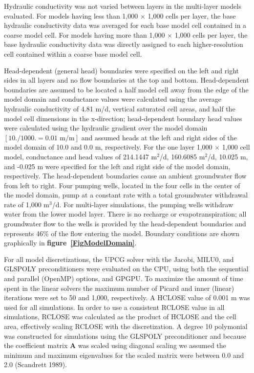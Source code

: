 \documentclass[12pt]{article}
\begin{document}
Hydraulic conductivity was not varied between layers in the multi-layer models evaluated. For models having less than 1,000 $\times$ 1,000 cells per layer, the base hydraulic conductivity data was averaged for each base model cell contained in a coarse model cell. For models having more than 1,000 $\times$ 1,000 cells per layer, the base hydraulic conductivity data was directly assigned to each higher-resolution cell contained within a coarse base model cell.

Head-dependent (general head) boundaries were specified on the left and right sides \color{cyan} in all layers \color{black} and no flow boundaries at the top and bottom. Head-dependent boundaries are assumed to be located a half model cell away from the edge of the model domain and conductance values were calculated using the average hydraulic conductivity of 4.81 m/d, vertical saturated cell areas, and half the model cell dimensions in the x-direction; head-dependent boundary head values were calculated using the hydraulic gradient over the model domain \color{blue}$\left [ 10. / 1000. = 0.01 \text{ m/m} \right]$ \color{black}and assumed heads at the left and right sides of the model domain of 10.0 and 0.0 m, respectively. For the one layer 1,000 $\times$ 1,000 cell model, conductance and head values of 214.1447 m$^{2}$/d, 160.6085 m$^{2}$/d, 10.025 m, and -0.025 m were specified for the left and right side of the model domain, respectively. The head-dependent boundaries cause an ambient groundwater flow from left to right. Four pumping wells, located in the four cells in the center of the model domain, pump at a constant rate with a total groundwater withdrawal rate of 1,000 m$^3$/d. For multi-layer simulations, the pumping wells withdraw water from the lower model layer. There is no recharge or evapotranspiration; all groundwater flow to the wells is provided by the head-dependent boundaries \color{cyan}and represents 46\% of the flow entering the model\color{black}. Boundary conditions are shown graphically in \textbf{figure~\ref{FigModelDomain}}.

For all model discretizations, the UPCG solver with the Jacobi, MILU0, and GLSPOLY preconditioners were evaluated on the CPU, using both the sequential and parallel (OpenMP) options, and GPGPU. To maximize the amount of time spent in the linear solvers the maximum number of Picard and inner (linear) iterations were set to 50 and 1,000, respectively. A HCLOSE value of 0.001 m was used for all simulations. In order to use a consistent RCLOSE value in all simulations, RCLOSE was calculated as the product of HCLOSE and the cell area, effectively scaling RCLOSE with the discretization. A degree 10 polymonial was constructed for simulations using the GLSPOLY preconditioner and because the coefficient matrix $\mathbf{A}$ was scaled using diagonal scaling we assumed the minimum and maximum eigenvalues for the scaled matrix were between 0.0 and 2.0 (Scandrett 1989).
\end{document}
